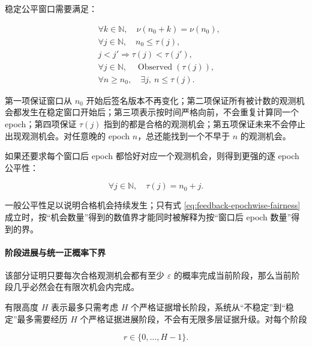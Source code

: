     稳定公平窗口需要满足：

    \begin{equation}
      \boxed{
        \begin{aligned}
          &\forall k\in\mathbb N,\quad
          \nu(n_0+k)=\nu(n_0),
          \\
          &\forall j\in\mathbb N,\quad
          n_0\le\tau(j),
          \\
          &j<j'
          \Longrightarrow
          \tau(j)<\tau(j'),
          \\
          &\forall j\in\mathbb N,\quad
          \operatorname{Observed}(\tau(j)),
          \\
          &\forall n\ge n_0,\quad
          \exists j,\ n\le\tau(j).
        \end{aligned}
      }
      \label{eq:feedback-stable-fair-window-laws}
    \end{equation}

    第一项保证窗口从 $n_{0}$ 开始后签名版本不再变化；第二项保证所有被计数的观测机会都发生在稳定窗口开始后；第三项表示按时间严格向前，不会重复计算同一个 epoch；第四项保证 $\tau(j)$ 指到的都是合格的观测机会；第五项保证未来不会停止出现观测机会。对任意晚的 epoch $n$，总还能找到一个不早于 $n$ 的观测机会。

    如果还要求每个窗口后 epoch 都恰好对应一个观测机会，则得到更强的逐 epoch 公平性：

    \begin{equation}
      \boxed{
        \forall j\in\mathbb N,\quad
        \tau(j)=n_0+j.
      }
      \label{eq:feedback-epochwise-fairness}
    \end{equation}

    一般公平性足以说明合格机会持续发生；只有式
    \eqref{eq:feedback-epochwise-fairness} 成立时，按“机会数量”得到的数值界才能同时被解释为按“窗口后 epoch 数量”得到的界。

    \paragraph{阶段进展与统一正概率下界} 该部分证明只要每次合格观测机会都有至少 $\varepsilon$ 的概率完成当前阶段，那么当前阶段几乎必然会在有限次机会内完成。

    有限高度 $H$ 表示最多只需考虑 $H$ 个严格证据增长阶段，系统从“不稳定”到“稳定”最多需要经历 $H$ 个严格证据进展阶段，不会有无限多层证据升级。对每个阶段

    \begin{equation}
    \boxed{
      r\in\{0,\ldots,H-1\}.}
      \label{eq:feedback-stage-index-range}
    \end{equation}

